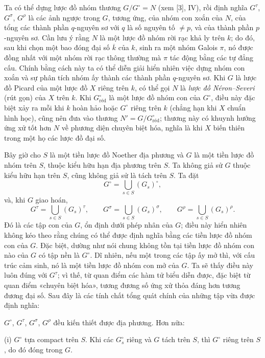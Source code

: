  Ta có thể dựng lược đồ nhóm thương
$G/G^\circ=N$ (xem [3], IV), rồi định nghĩa $G^\tau$, $G^\sigma$, $G^\rho$
là các ảnh ngược trong $G$, tương ứng, của nhóm con xoắn của $N$, của tổng
các thành phần $q$-nguyên sơ với $q$ là số nguyên tố $\neq p$, và của thành
phần $p$-nguyên sơ. Cần lưu ý rằng $N$ là một lược đồ nhóm rời rạc khả ly trên
$k$; do đó, sau khi chọn một bao đóng đại số $\overline k$ của $k$, sinh ra
một nhóm Galois $\pi$, nó được đồng nhất với một nhóm rời rạc thông thường mà
$\pi$ tác động bằng các tự đẳng cấu. Chính bằng cách này ta có thể diễn giải
hiển nhiên việc dựng nhóm con xoắn và sự phân tích nhóm ấy thành các thành
phần $q$-nguyên sơ. Khi $G$ là lược đồ Picard của một lược đồ $X$ riêng trên
$k$, có thể gọi $N$ là \emph{lược đồ Néron--Severi} (rút gọn) của $X$ trên
$k$. Khi $G^\circ_{\mathrm{réd}}$ là một lược đồ nhóm con của $G^\circ$, điều
này đặc biệt xảy ra mỗi khi $k$ hoàn hảo hoặc $G^\circ$ riêng trên $k$ (chẳng
hạn khi $X$ chuẩn hình học), cũng nên đưa vào thương
$N'=G/G^\circ_{\mathrm{réd}}$; thương này có khuynh hướng ứng xử tốt hơn $N$
về phương diện chuyên biệt hóa, nghĩa là khi $X$ biến thiên trong một họ các
lược đồ đại số.

Bây giờ cho $S$ là một tiền lược đồ Noether địa phương và $G$ là một tiền
lược đồ nhóm trên $S$, thuộc kiểu hữu hạn địa phương trên $S$. Ta không giả
sử $G$ thuộc kiểu hữu hạn trên $S$, cũng không giả sử là tách trên $S$. Ta
đặt
\[
G^\circ=\bigcup_{s\in S}(G_s)^\circ,
\]
và, khi $G$ giao hoán,
\[
G^\tau=\bigcup_{s\in S}(G_s)^\tau,
\qquad
G^\sigma=\bigcup_{s\in S}(G_s)^\sigma,
\qquad
G^\rho=\bigcup_{s\in S}(G_s)^\rho.
\]
Đó là các tập con của $G$, ổn định dưới phép nhân của $G$; điều này hiển nhiên
không kéo theo rằng chúng có thể được định nghĩa bằng các tiền lược đồ nhóm
con của $G$. Đặc biệt, dường như nói chung không tồn tại tiền lược đồ nhóm
con nào của $G$ có tập nền là $G^\circ$. Dĩ nhiên, nếu một trong các tập ấy
mở thì, với cấu trúc cảm sinh, nó là một tiền lược đồ nhóm con mở của $G$. Ta
sẽ thấy điều này luôn đúng với $G^\tau$; vì thế, từ quan điểm các hàm tử biểu
diễn được, đặc biệt từ quan điểm «chuyên biệt hóa», tương đương số ứng xử thỏa
đáng hơn tương đương đại số. Sau đây là các tính chất tổng quát chính của
những tập vừa được định nghĩa:

 $G^\circ$, $G^\tau$, $G^\sigma$, $G^\rho$ đều kiến
thiết được địa phương. Hơn nữa:

\noindent (i) $G^\circ$ tựa compact trên $S$. Khi các $G_s^\circ$ riêng và
$G$ tách trên $S$, thì $G^\circ$ riêng trên $S$, do đó đóng trong $G$.

